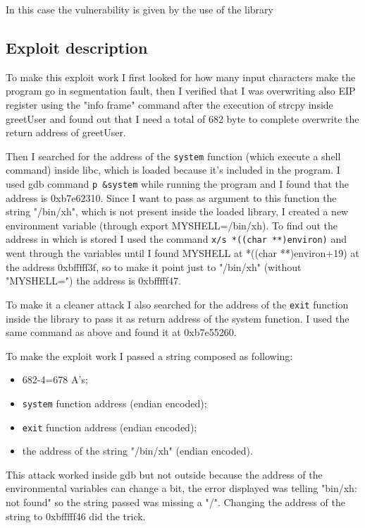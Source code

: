 \documentclass[a4paper,12pt]{article}
\begin{document}
In this case the vulnerability is given by the use of the library 

\subsection{Exploit description} 

To make this exploit work I first looked for how many input characters make the program go in segmentation fault, then I verified that I was overwriting also EIP register using the "info frame" command after the execution of strcpy inside greetUser and found out that I need a total of 682 byte to complete overwrite the return address of greetUser.

Then I searched for the address of the \texttt{system} function (which execute a shell command) inside libc, which is loaded because it's included in the program. I used gdb command \texttt{p \&system} while running the program and I found that the address is 0xb7e62310. Since I want to pass as argument to this function the string "/bin/xh", which is not present inside the loaded library, I created a new environment variable (through export MYSHELL=/bin/xh).
 To find out the address in which is stored I used the command \texttt{x/s *((char **)environ)} and went through the variables until I found MYSHELL at   *((char **)environ+19) at the address 0xbfffff3f, so to make it point just to "/bin/xh" (without "MYSHELL=") the address is 0xbfffff47.
 
To make it a cleaner attack I also searched for the address of the \texttt{exit} function inside the library to pass it as return address of the system function. I used the same command as above and found it at 0xb7e55260.

To make the exploit work I passed a string composed as following:
\begin{itemize}
\item 682-4=678 A's;
\item \texttt{system} function address (endian encoded);
\item \texttt{exit} function address (endian encoded);
\item the address of the string "/bin/xh" (endian encoded).
\end{itemize}

This attack worked inside gdb but not outside because the address of the environmental variables can change a bit, the error displayed was telling "bin/xh: not found" so the string passed was missing a "/". Changing the address of the string to 0xbfffff46 did the trick.
\end{document}

